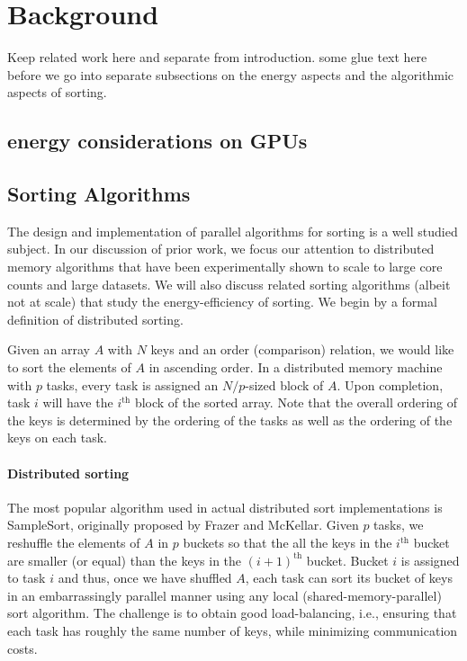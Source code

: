 \section{Background}
Keep related work here and separate from introduction. some glue text here before we go into separate subsections on the energy aspects and the algorithmic aspects of sorting.

\subsection{energy considerations on GPUs}

\subsection{Sorting Algorithms}
\label{sec:bg-dist}

The design and implementation of parallel algorithms for sorting is a well studied subject. In our discussion of prior work, we focus our attention to distributed memory algorithms that have been experimentally shown to scale to large core counts and large datasets. We will also discuss related sorting algorithms (albeit not at scale) that study the energy-efficiency of sorting. We begin by a formal definition of distributed sorting.

Given an array $A$ with $N$ keys and an order (comparison) relation, we would like to sort the elements of $A$ in ascending order. In a distributed memory machine with $p$ tasks, every task is assigned an $N/p$-sized block of $A$. Upon completion, task $i$ will have the $i^{\text{th}}$ block of the sorted array. Note that the overall ordering of the keys is determined by the ordering of the tasks as well as the ordering of the keys on each task.  

\paragraph{Distributed sorting}

The most popular algorithm used in actual distributed
sort implementations is SampleSort, originally proposed by Frazer and McKellar\cite{samplesort}. Given $p$ tasks, we
reshuffle the elements of $A$ in $p$ buckets so that the all the
keys in the $i^\text{th}$ bucket are smaller (or equal) than the keys in
the $(i+1)^\text{th}$ bucket. Bucket $i$ is assigned to task $i$ and thus,
once we have shuffled $A$, each task can sort its bucket of
keys in an embarrassingly parallel manner using any local
(shared-memory-parallel) sort algorithm. The challenge is to obtain good load-balancing, i.e., ensuring that each 
task  has roughly the same number of keys, while minimizing communication costs.  

